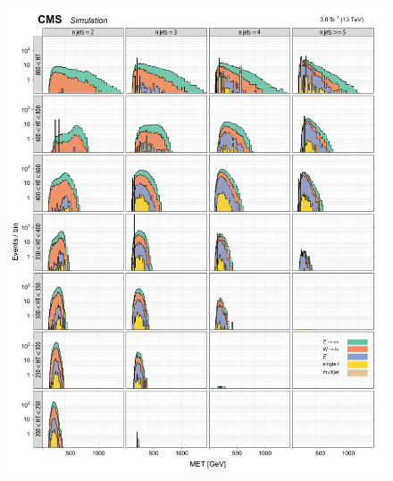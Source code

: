 \begin{figure}[!h]
\centering
\includegraphics[scale=0.95]{figures/kiplots/c150107_s150318_f015_MET_100}
\end{figure}

